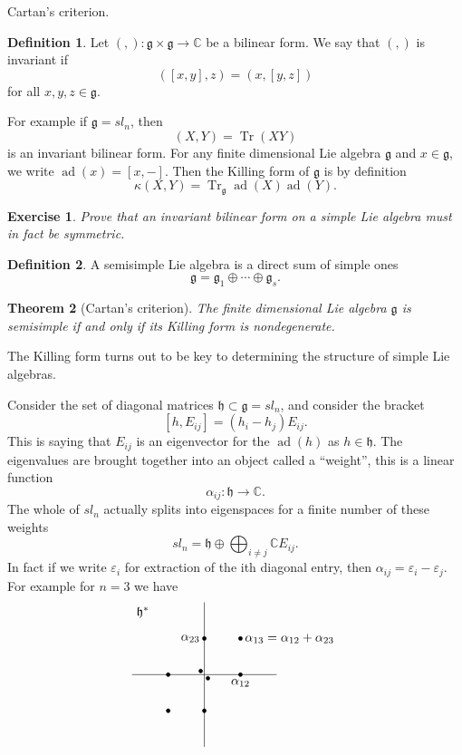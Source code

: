 \documentclass[12pt]{article}
\theoremstyle{plain}
\newtheorem{thm}{Theorem}[section]
\newtheorem{exer}[thm]{Exercise}
\theoremstyle{definition}
\newtheorem{defn}{Definition}[section]
\numberwithin{equation}{section}
\DeclareMathOperator{\ad}{ad}
\DeclareMathOperator{\tr}{Tr}
\newcommand{\C}{\mathbb{C}}
\newcommand{\g}{\mathfrak{g}}
\newcommand{\h}{\mathfrak{h}}
\begin{document}

Cartan's criterion.

\begin{defn}
Let $(,) : \g \times \g \rightarrow \C$ be a bilinear form. We say that $(,)$ is invariant if
\[
([x, y], z) = (x, [y, z])
\]
for all $x, y, z \in \g$.
\end{defn}
For example if $\g = sl_n$, then
\[
(X, Y) = \tr(XY)
\]
is an invariant bilinear form.  For any finite dimensional Lie algebra $\g$ and $x \in \g$, we write $\ad(x) = [x, -]$. Then the Killing form of $\g$ is by definition
\[
\kappa(X, Y) = \tr_\g \ad(X) \ad(Y).
\]
\begin{exer}
Prove that an invariant bilinear form on a simple Lie algebra must in fact be symmetric.
\end{exer}

\begin{defn}
A semisimple Lie algebra is a direct sum of simple ones
\[
\g = \g_1 \oplus \cdots \oplus \g_s.
\]
\end{defn}
\begin{thm}[Cartan's criterion]
The finite dimensional Lie algebra $\g$ is semisimple if and only if its Killing form is nondegenerate.
\end{thm}
The Killing form turns out to be key to determining the structure of simple Lie algebras.

Consider the set of diagonal matrices $\h \subset \g = sl_n$, and consider the bracket
\[
[h, E_{ij}] = (h_i - h_j) E_{ij}.
\]
This is saying that $E_{ij}$ is an eigenvector for the $\ad(h)$ as $h \in \h$. The eigenvalues are brought together into an object called a ``weight'', this is a linear function
\[
\alpha_{ij} : \h \rightarrow \C.
\]
The whole of $sl_n$ actually splits into eigenspaces for a finite number of these weights
\[
sl_n = \h \oplus \bigoplus_{i \neq j} \C E_{ij}.
\]
In fact if we write $\varepsilon_i$ for extraction of the ith diagonal entry, then $\alpha_{ij} = \varepsilon_i - \varepsilon_j$.
For example for $n=3$ we have
\[
\begin{tikzpicture}
	\draw[] (0,-2) -- (0,2) (-2,0) -- (2,0);
	\draw[fill] (-0.1,0.1) circle(1.5pt) (0.1,-0.1) circle(1.5pt) (1,0) circle(1.5pt) node[below]{$\alpha_{12}$} (0,1) circle(1.5pt) node[left]{$\alpha_{23}$} (1,1) circle(1.5pt) node[right]{$\alpha_{13} = \alpha_{12} + \alpha_{23}$} (-1,0) circle(1.5pt) (0,-1) circle(1.5pt) (-1,-1) circle(1.5pt);
	\node[anchor = north west] at (-2,2) {$\h^\ast$};
\end{tikzpicture}
\]
\end{document}
